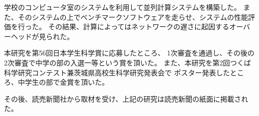 \def \wrkdir {p.ngk/}

 \label{pa:ngk}
学校のコンピュータ室のシステムを利用して並列計算システムを構築した。
また、そのシステムの上でベンチマークソフトウェアを走らせ、システムの性能評価を行った。
その結果、計算によってはネットワークの遅さに起因するオーバーヘッドが見られた。

本研究を第56回日本学生科学賞に応募したところ、
1次審査を通過し、その後の2次審査で中学の部の入選一等という賞を頂いた。
また、本研究を第2回つくば科学研究コンテスト兼茨城県高校生科学研究発表会で
ポスター発表したところ、中学生の部で金賞を頂いた。

その後、読売新聞社から取材を受け、上記の研究は読売新聞の紙面に掲載された。
